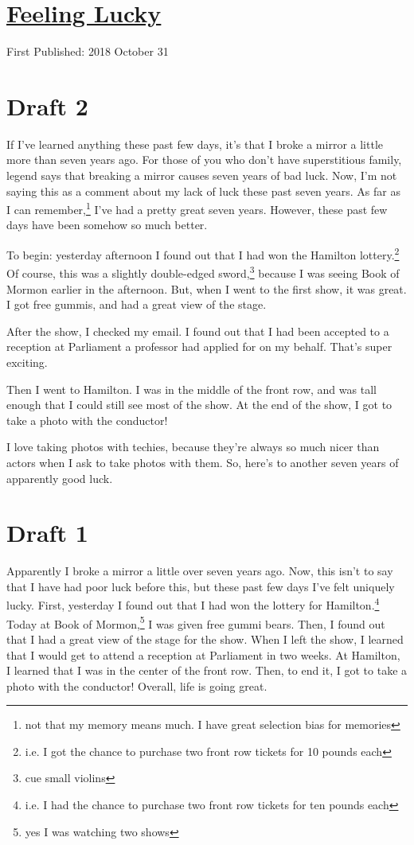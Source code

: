 \documentclass[12pt]{article}[titlepage]
\newcommand{\1}{\={a}}
\newcommand{\2}{\={e}}
\newcommand{\3}{\={\i}}
\newcommand{\4}{\=o}
\newcommand{\5}{\=u}
\newcommand{\6}{\={A}}
\renewcommand{\,}{\textsuperscript{,}}
\begin{document}
\doublespacing
\section{\href{feeling-lucky.html}{Feeling Lucky}}
First Published: 2018 October 31
\section{Draft 2}
If I've learned anything these past few days, it's that I broke a mirror a little more than seven years ago.
For those of you who don't have superstitious family, legend says that breaking a mirror causes seven years of bad luck.
Now, I'm not saying this as a comment about my lack of luck these past seven years.
As far as I can remember,\footnote{not that my memory means much. I have great selection bias for memories} I've had a pretty great seven years.
However, these past few days have been somehow so much better.

To begin: yesterday afternoon I found out that I had won the Hamilton lottery.\footnote{i.e. I got the chance to purchase two front row tickets for 10 pounds each}
Of course, this was a slightly double-edged sword,\footnote{cue small violins} because I was seeing Book of Mormon earlier in the afternoon.
But, when I went to the first show, it was great.
I got free gummis, and had a great view of the stage.

After the show, I checked my email.
I found out that I had been accepted to a reception at Parliament a professor had applied for on my behalf.
That's super exciting.

Then I went to Hamilton.
I was in the middle of the front row, and was tall enough that I could still see most of the show.
At the end of the show, I got to take a photo with the conductor!

I love taking photos with techies, because they're always so much nicer than actors when I ask to take photos with them.
So, here's to another seven years of apparently good luck.
\section{Draft 1}
Apparently I broke a mirror a little over seven years ago.
Now, this isn't to say that I have had poor luck before this, but these past few days I've felt uniquely lucky.
First, yesterday I found out that I had won the lottery for Hamilton.\footnote{i.e. I had the chance to purchase two front row tickets for ten pounds each}
Today at Book of Mormon,\footnote{yes I was watching two shows} I was given free gummi bears.
Then, I found out that I had a great view of the stage for the show.
When I left the show, I learned that I would get to attend a reception at Parliament in two weeks.
At Hamilton, I learned that I was in the center of the front row.
Then, to end it, I got to take a photo with the conductor!
Overall, life is going great.
\end{document}
